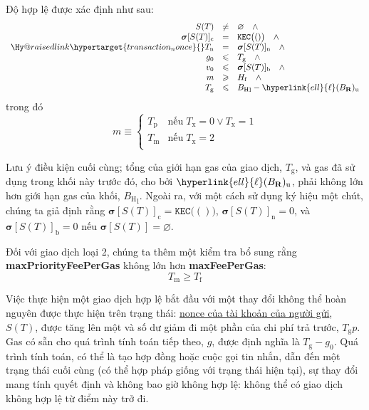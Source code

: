 \documentclass[9pt,oneside]{amsart}
\makeatletter
\newcommand{\linkdest}[1]{\Hy@raisedlink{\hypertarget{#1}{}}}
\makeatother
\begin{document}
\begin{multicols}{2}
Độ hợp lệ được xác định như sau:
\begin{equation}
\begin{array}[t]{rcl}
S(T) & \neq & \varnothing \quad \wedge \\
\boldsymbol{\sigma}[S(T)]_{\mathrm{c}} & = & \texttt{KEC}\big( () \big) \quad \wedge \\
\linkdest{transaction_nonce}{}T_{\mathrm{n}} & = & \boldsymbol{\sigma}[S(T)]_{\mathrm{n}} \quad \wedge \\
g_0 & \leqslant & T_{\mathrm{g}} \quad \wedge \\
v_0 & \leqslant & \boldsymbol{\sigma}[S(T)]_{\mathrm{b}} \quad \wedge \\
m & \geqslant & H_{\mathrm{f}} \quad \wedge \\
T_{\mathrm{g}} & \leqslant & {B_{\mathrm{H}}}_{\mathrm{l}} - \hyperlink{ell}{\ell}(B_{\mathbf{R}})_{\mathrm{u}}
\end{array}
\end{equation}
trong đó
\begin{equation}
  m \equiv \begin{cases}
  T_{\mathrm{p}} & \text{nếu} \; T_{\mathrm{x}} = 0 \lor T_{\mathrm{x}} = 1 \\
  T_{\mathrm{m}} & \text{nếu} \; T_{\mathrm{x}} = 2 \\
  \end{cases}
\end{equation}

Lưu ý điều kiện cuối cùng; tổng của giới hạn gas của giao dịch, $T_{\mathrm{g}}$, và gas đã sử dụng trong khối này trước đó, cho bởi $\hyperlink{ell}{\ell}(B_{\mathbf{R}})_{\mathrm{u}}$, phải không lớn hơn giới hạn gas của khối, ${B_{\mathrm{H}}}_{\mathrm{l}}$.
Ngoài ra, với một cách sử dụng ký hiệu một chút, chúng ta giả định rằng $\boldsymbol{\sigma}[S(T)]_{\mathrm{c}} = \texttt{KEC}\big( () \big)$, $\boldsymbol{\sigma}[S(T)]_{\mathrm{n}} = 0$, và $\boldsymbol{\sigma}[S(T)]_{\mathrm{b}} = 0$ nếu $\boldsymbol{\sigma}[S(T)] = \varnothing$.

Đối với giao dịch loại 2, chúng ta thêm một kiểm tra bổ sung rằng \textbf{maxPriorityFeePerGas} không lớn hơn \textbf{maxFeePerGas}:
\begin{equation}
  T_{\mathrm{m}} \geqslant T_{\mathrm{f}}
\end{equation}

Việc thực hiện một giao dịch hợp lệ bắt đầu với một thay đổi không thể hoàn nguyên được thực hiện trên trạng thái: \hyperlink{account_nonce}{nonce của tài khoản của người gửi}, $S(T)$, được tăng lên một và số dư giảm đi một phần của chi phí trả trước, $T_{\mathrm{g}} p$. Gas có sẵn cho quá trình tính toán tiếp theo, $g$, được định nghĩa là $T_{\mathrm{g}} - g_0$. Quá trình tính toán, có thể là tạo hợp đồng hoặc cuộc gọi tin nhắn, dẫn đến một trạng thái cuối cùng (có thể hợp pháp giống với trạng thái hiện tại), sự thay đổi mang tính quyết định và không bao giờ không hợp lệ: không thể có giao dịch không hợp lệ từ điểm này trở đi.


\end{multicols}
\end{document}
